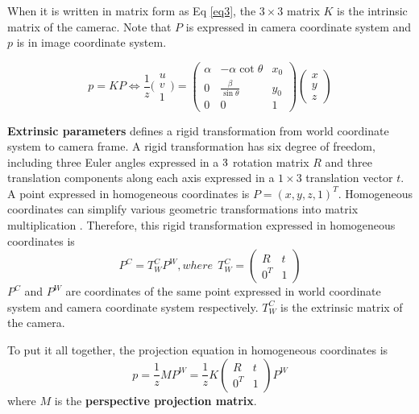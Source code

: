 When it is written in matrix form as Eq \ref{eq3}, the $3\times3$ matrix $K$ is the intrinsic matrix of the camerac. Note that $P$ is expressed in camera coordinate system and $p$ is in image coordinate system.

\begin{equation}
\label{eq3}
p = K P \Leftrightarrow \frac{1}{z}
\bigl(\begin{smallmatrix}
u\\  v \\1
\end{smallmatrix}\bigr) 
= 
\begin{pmatrix}
\alpha & -\alpha \cot\theta & x_0\\ 0 & \frac{\beta}{\sin\theta}  & y_0\\  0 &0  &1 
\end{pmatrix}
\begin{pmatrix} 
x\\  y\\  z
\end{pmatrix}
\end{equation}

\textbf{Extrinsic parameters} defines a rigid transformation from world coordinate system to camera frame. A rigid transformation has six degree of freedom, including three Euler angles expressed in a $3\time3$ rotation matrix $R$ and three translation components along each axis expressed in a $1\times3$ translation vector $t$. A point expressed in homogeneous coordinates is $P=(x, y, z, 1)^T$. Homogeneous coordinates can simplify various geometric transformations into matrix multiplication \cite{Forsyth:2002:CVM:580035}.  Therefore, this rigid transformation expressed in homogeneous coordinates is 
\begin{equation}
\label{eq4}
P^{C} = T_W^C P^W, where ~~T_W^C = 
\begin{pmatrix}
	R & t\\ 
	0^T& 1
\end{pmatrix}
\end{equation}
$P^{C}$ and $P^W$ are coordinates of the same point expressed in world coordinate system and camera coordinate system respectively. $T_W^C$ is the extrinsic matrix of the camera.

To put it all together, the projection equation in homogeneous coordinates is 
\begin{equation}
\label{eq5}
p = \frac{1}{z} M P^W = \frac{1}{z} K
\begin{pmatrix}
R & t\\ 
0^T& 1
\end{pmatrix} P^W
\end{equation}
where $M$ is the \textbf{perspective projection matrix}.